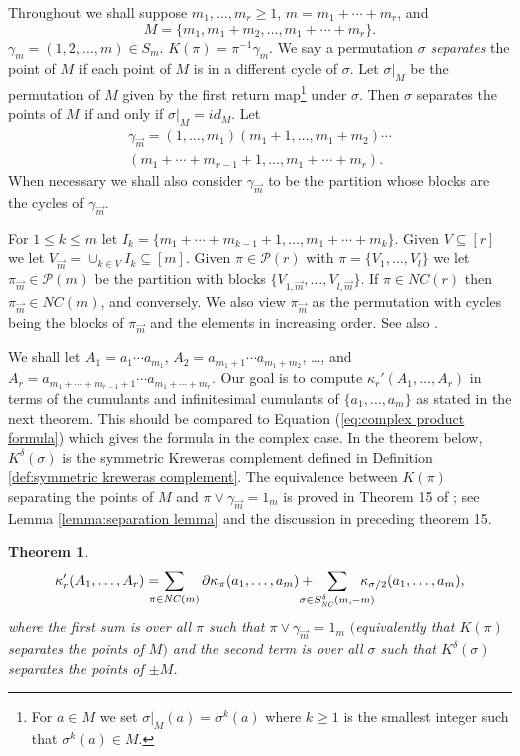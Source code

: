 \documentclass[11pt]{amsart}
\newtheorem{theorem}{Theorem}
\theoremstyle{definition}
\numberwithin{theorem}{section}
\newcommand{\cP}{\mathcal{P}}
\newcommand{\NC}{\mathit{NC}}
\newcommand{\vm}{{\vec{m}}}
\newcommand{\id}{\mathit{id}}
\newcommand{\ab}{\allowbreak}
\begin{document}
Throughout we shall suppose $m_1 , \dots, m_r \geq 1$, $m =
m_1 + \cdots + m_r$, and
\[
M = \{m_1, m_1 + m_2, \dots, m_1 + \cdots + m_r\}.
\] 
$\gamma_m = (1, 2, \dots, m) \in S_m$. $K(\pi) = \pi^{-1}
\gamma_m$. We say a permutation $\sigma$ \textit{separates}
the point of $M$ if each point of $M$ is in a different
cycle of $\sigma$. Let $\sigma|_M$ be the permutation of $M$
given by the first return map\footnote{For $a \in M$ we set
$\sigma|_M(a) = \sigma^k(a)$ where $k \geq 1$ is the
smallest integer such that $\sigma^k(a) \in M$.} under
$\sigma$. Then $\sigma$ separates the points of $M$ if and
only if $\sigma|_M = \id_M$. Let
\begin{multline*}
\gamma_{\vm}
=
(1, \dots, m_1)(m_1 + 1, \dots, m_1 + m_2)
\cdots \\
(m_1 + \cdots + m_{r-1} + 1, \dots,
m_1 + \cdots + m_r).
\end{multline*}
When necessary we shall also consider $\gamma_\vm$ to be the
partition whose blocks are the cycles of $\gamma_\vm$.


For $1 \leq k \leq m$ let $I_k = \{ m_1 + \cdots + m_{k-1}
+1, \dots, m_1 + \cdots + m_k\}$. Given $V \subseteq [r]$ we
let $V_\vm = \cup_{k\in V} I_k \subseteq [m]$. Given $\pi
\in \cP(r)$ with $\pi = \{V_1, \dots, V_l\}$ we let $\pi_\vm
\in \cP(m)$ be the partition with blocks $\{ V_{1, \vm},
\dots, V_{l,\vm}\}$. If $\pi \in \NC(r)$ then $\pi_\vm \in
\NC(m)$, and conversely. We also view $\pi_\vm$ as the
permutation with cycles being the blocks of $\pi_\vm$ and
the elements in increasing order. See also
\cite[Def.~9]{mst}.



We shall let $A_1 = a_1 \cdots a_{m_1}$, $A_2 = a_{m_1 + 1}
\cdots\ab a_{m_1 + m_2}$, \dots, and $A_r = a_{m_1 + \cdots
  + m_{r-1} + 1} \cdots a_{m_1 + \cdots + m_{r}}$. Our goal
is to compute $\kappa_r'(A_1, \dots, A_r)$ in terms of the
cumulants and infinitesimal cumulants of $\{ a_1, \dots,
a_m\}$ as stated in the next theorem. This should be
compared to Equation (\ref{eq:complex product formula})
which gives the formula in the complex case. In the theorem
below, $K^\delta(\sigma)$ is the symmetric Kreweras
complement defined in Definition \ref{def:symmetric kreweras
  complement}. The equivalence between $K(\pi)$ separating
the points of $M$ and $\pi \vee \gamma_\vm = 1_m$ is proved
in Theorem 15 of \cite{mst}; see Lemma \ref{lemma:separation
  lemma} and the discussion in \cite{mst} preceding theorem
15.

\begin{theorem}\label{thm:product rule}
\begin{equation}\label{eq:the product rule}
\kappa_r'(A_1, \dots, A_r)
= \kern-1em
\sum_{\pi \in \NC(m)} \partial \kappa_\pi(a_1, \dots, a_m)
+ \kern-1.2em
\sum_{\sigma \in S_\NC^\delta(m, -m)} \kern-1.2em \kappa_{\sigma/2}
(a_1, \dots, a_m),
\end{equation}
where the first sum is over all $\pi$ such that $\pi \vee
\gamma_\vm = 1_m$ $($equivalently that $K(\pi)$ separates
the points of $M)$ and the second term is over all $\sigma$
such that $K^\delta(\sigma)$ separates the points of $\pm
M$.
\end{theorem}
\end{document}
